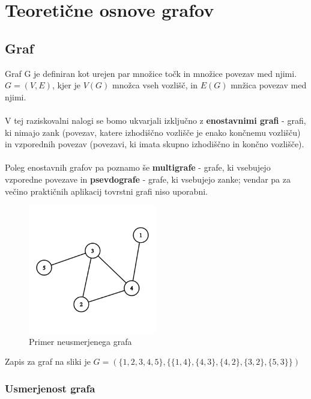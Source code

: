 \documentclass[11pt]{article}
\begin{document}
\newpage

\section{Teoretične osnove grafov}

\subsection{Graf}

Graf G je definiran kot urejen par množice točk in množice povezav med njimi. $G = (V, E)$, kjer je $V(G)$ množca vseh vozlišč, in $E(G)$ mnžica povezav med njimi.
\\  \\
V tej raziskovalni nalogi se bomo ukvarjali izključno z \textbf{enostavnimi grafi} - grafi, ki nimajo zank (povezav, katere izhodiščno vozlišče je enako končnemu vozlišču) in vzporednih povezav (povezavi, ki imata skupno izhodiščno in končno vozlišče). 
\\ \\
Poleg enostavnih grafov pa poznamo še \textbf{multigrafe} - grafe, ki vsebujejo vzporedne povezave in \textbf{psevdografe} - grafe, ki vsebujejo zanke; vendar pa za večino praktičnih aplikacij tovrstni grafi niso uporabni. \cite{zapiski, psevdo}

\begin{figure}[H]
    \centering
    \includegraphics[width=0.5\textwidth]{unweighted_graph.png}
    \caption{Primer neusmerjenega grafa}
    \label{fig:mesh1}
\end{figure}

Zapis za graf na sliki je $G = (\{1, 2, 3, 4, 5\}, \{\{1, 4\}, \{4, 3\}, \{4, 2\}, \{3, 2\}, \{5, 3\}\})$

\subsubsection{Usmerjenost grafa}
\end{document}
